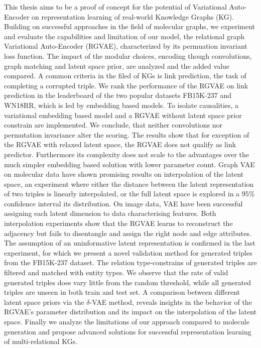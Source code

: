 \documentclass{article}
\begin{document}
This thesis aims to be a proof of concept for the potential of Variational Auto-Encoder on representation learning of real-world Knowledge Graphs (KG). Building on successful approaches in the field of molecular graphs, we experiment and evaluate the capabilities and limitation of our model, the relational graph Variational Auto-Encoder (RGVAE), characterized by its permuation invariant loss function. The impact of the modular choices, encoding though convolutions, graph matching and latent space prior, are analyzed and the added value compared. A common criteria in the filed of KGs is link prediction, the task of completing a corrupted triple. We rank the performance of the RGVAE on link prediction in the leaderboard of the two popular datasets FB15K-237 and WN18RR, which is led by embedding based models. To isolate causalities, a variational embedding based model and a RGVAE without latent space prior constrain are implemented. We conclude, that neither convolutions nor permutation invariance alter the scoring. The results show that for exception of the RGVAE with relaxed latent space, the RGVAE does not qualify as link predictor. Furthermore its complexity does not scale to the advantages over the much simpler embedding based solution with lower parameter count.
Graph VAE on molecular data have shown promising results on interpolation of the latent space, an experiment where either the distance between the latent representation of two triples is linearly interpolated, or the full latent space is explored in a $95$\% confidence interval its distribution. On image data, VAE have been successful assigning each latent dimension to data characterising features. Both interpolation experiments show that the RGVAE learns to reconstruct the adjacency but fails to disentangle and assign the right node and edge attributes. The assumption of an uninformative latent representation is confirmed in the last experiment, for which we present a novel validation method for generated triples from the FB15K-237 dataset. The relation type-constrains of generated triples are filtered and matched with entity types. We observe that the rate of valid generated triples does vary little from the random threshold, while all generated triples are unseen in both train and test set. A comparison between different latent space priors via the $\delta$-VAE method, reveals insights in the behavior of the RGVAE's parameter distribution and its impact on the interpolation of the latent space. Finally we analyze the limitations of our approach compared to molecule generation and propose advanced solutions for successful representation learning of multi-relational KGs. 
\end{document}
